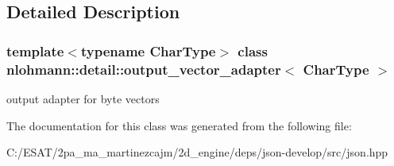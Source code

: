 \subsection{Detailed Description}
\subsubsection*{template$<$typename Char\+Type$>$\newline
class nlohmann\+::detail\+::output\+\_\+vector\+\_\+adapter$<$ Char\+Type $>$}

output adapter for byte vectors 

The documentation for this class was generated from the following file\+:\begin{DoxyCompactItemize}
\item 
C\+:/\+E\+S\+A\+T/2pa\+\_\+ma\+\_\+martinezcajm/2d\+\_\+engine/deps/json-\/develop/src/json.\+hpp\end{DoxyCompactItemize}
